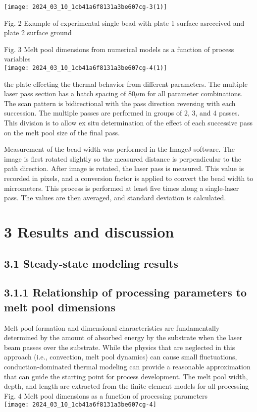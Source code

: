 \documentclass[10pt]{article}
\begin{document}
\begin{center}
\texttt{[image: 2024\_03\_10\_1cb41a6f8131a3be607cg-3(1)]}
\end{center}

Fig. 2 Example of experimental single bead with plate 1 surface asreceived and plate 2 surface ground

Fig. 3 Melt pool dimensions from numerical models as a function of process variables\\
\texttt{[image: 2024\_03\_10\_1cb41a6f8131a3be607cg-4(1)]}

the plate effecting the thermal behavior from different parameters. The multiple laser pass section has a hatch spacing of $80 \mu \mathrm{m}$ for all parameter combinations. The scan pattern is bidirectional with the pass direction reversing with each succession. The multiple passes are performed in groups of 2, 3, and 4 passes. This division is to allow ex situ determination of the effect of each successive pass on the melt pool size of the final pass.

Measurement of the bead width was performed in the ImageJ software. The image is first rotated slightly so the measured distance is perpendicular to the path direction. After image is rotated, the laser pass is measured. This value is recorded in pixels, and a conversion factor is applied to convert the bead width to micrometers. This process is performed at least five times along a single-laser pass. The values are then averaged, and standard deviation is calculated.

\section*{3 Results and discussion}
\subsection*{3.1 Steady-state modeling results}
\subsection*{3.1.1 Relationship of processing parameters to melt pool dimensions}
Melt pool formation and dimensional characteristics are fundamentally determined by the amount of absorbed energy by the substrate when the laser beam passes over the substrate. While the physics that are neglected in this approach (i.e., convection, melt pool dynamics) can cause small fluctuations, conduction-dominated thermal modeling can provide a reasonable approximation that can guide the starting point for process development. The melt pool width, depth, and length are extracted from the finite element models for all processing\\
Fig. 4 Melt pool dimensions as a function of processing parameters\\
\texttt{[image: 2024\_03\_10\_1cb41a6f8131a3be607cg-4]}
\end{document}

